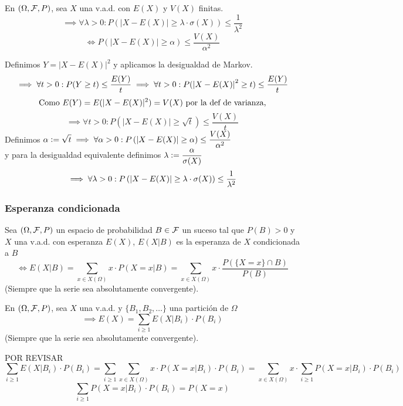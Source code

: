 \begin{teo}
	En $(\Omega, \mathcal{F}, P)$, sea $X$ una v.a.d. con $E(X)$ y $V(X)$ finitas.
	\[\implies \forall \lambda>0 : P(|X-E(X)|\geq \lambda\cdot \sigma(X)) \leq \frac{1}{\lambda^2}\]
	\[\iff P\left(|X-E(X)|\geq \alpha\right) \leq \frac{V(X)}{\alpha^2}\]
	\begin{dem}
		Definimos $Y=|X-E(X)|^2$ y aplicamos la desigualdad de Markov.
		\[\implies \forall t > 0 : P(Y\geq t) \leq \frac{E(Y)}{t} \implies \forall t>0: P(\left|X-E(X)\right|^2\geq t)\leq \frac{E(Y)}{t}\]
		\[\text{Como } E(Y) = E(|X-E(X)|^2) = V(X) \text{ por la def de varianza,}\]
		\[\implies \forall t>0: P\left(|X-E(X)|\geq \sqrt{t}\right)\leq \frac{V(X)}{t}\]
		Definimos $\displaystyle \alpha\vcentcolon= \sqrt{t} \implies \forall \alpha>0: P\left(|X-E(X)|\geq \alpha\right)\leq \frac{V(X)}{\alpha^2}$\\
		y para la desigualdad equivalente definimos $\displaystyle \lambda \vcentcolon= \frac{\alpha}{\sigma(X)}$
		\[\implies \forall \lambda>0 : P\left(\left|X-E(X)\right|\geq \lambda\cdot \sigma(X)\right) \leq \frac{1}{\lambda^2}\]
	\end{dem}
\end{teo}

\subsubsection{Esperanza condicionada}

\begin{defn}
	Sea $(\Omega, \mathcal{F}, P)$ un espacio de probabilidad $B\in \mathcal{F}$ un suceso tal que $P(B)>0$ y  $X$ una v.a.d. con esperanza $E(X)$, $E(X|B)$ es la esperanza de $X$ condicionada a $B$
	\[\iff E(X|B) = \sum_{x\in X(\Omega)} x \cdot P(X=x | B) = \sum_{x\in X(\Omega)} x \cdot \frac{P(\{X=x\}\cap B)}{P(B)}\]
	(Siempre que la serie sea absolutamente convergente).
\end{defn}

\begin{teo}
	En $(\Omega, \mathcal{F}, P)$, sea $X$ una v.a.d. y $\{B_1, B_2, \dots\}$ una partición de $\Omega$
	\[\implies E(X)=\sum_{i\geq 1} E(X|B_i)\cdot P(B_i)\]
	(Siempre que la serie sea absolutamente convergente).
	\begin{dem}
		POR REVISAR
		\[\sum_{i\geq 1} E(X|B_i)\cdot P(B_i)=\sum_{i\geq 1}\sum_{x\in X(\Omega)} x\cdot P(X=x|B_i)\cdot P(B_i)=\sum_{x\in X(\Omega)} x\cdot \sum_{i\geq 1} P(X=x|B_i)\cdot P(B_i)\]
		\[\sum_{i\geq 1} P(X=x|B_i)\cdot P(B_i)=P(X=x)\]
	\end{dem}
\end{teo}

